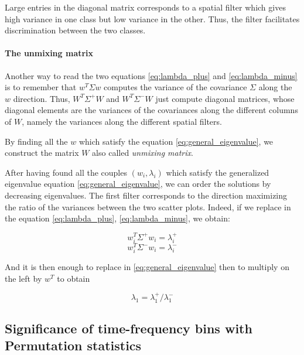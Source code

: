 Large entries in the diagonal matrix corresponds to a spatial filter which gives high variance in one class but low variance in the other. Thus, the filter facilitates discrimination between the two classes.

\paragraph{The unmixing matrix}

Another way to read the two equations \ref{eq:lambda_plus} and \ref{eq:lambda_minus} is to remember that $w^{T}\Sigma w$ computes the variance of the covariance $\Sigma$ along the $w$ direction. Thus, $W^{T} \Sigma^{+} W$ and $W^{T} \Sigma^{-} W$ just compute diagonal matrices, whose diagonal elements are the variances of the covariances along the different columns of $W$, namely the variances along the different spatial filters.

By finding all the $w$ which satisfy the equation \ref{eq:general_eigenvalue}, we construct the matrix $W$ also called \textit{unmixing matrix}.

After having found all the couples $(w_i, \lambda_i)$ which satisfy the generalized eigenvalue equation \ref{eq:general_eigenvalue}, we can order the solutions by decreasing eigenvalues. The first filter corresponds to the direction maximizing the ratio of the variances between the two scatter plots. Indeed, if we replace in the equation \ref{eq:lambda_plus}, \ref{eq:lambda_minus}, we obtain:

\begin{equation}
    w^{T}_{i} \Sigma^{+} w_{i} = \lambda^{+}_{i}
    \label{eq:lambda_plus_first_component}
\end{equation}
\begin{equation}
    w^{T}_{i} \Sigma^{-} w_{i} = \lambda^{-}_{i}
    \label{eq:lambda_minus_first_component}
\end{equation}

And it is then enough to replace in \ref{eq:general_eigenvalue} then to multiply on the left by $w^{T}$ to obtain


\begin{equation}
    \lambda_1 = \lambda^{+}_1 / \lambda^{-}_1
\end{equation}


\subsection{Significance of time-frequency bins with Permutation statistics}

